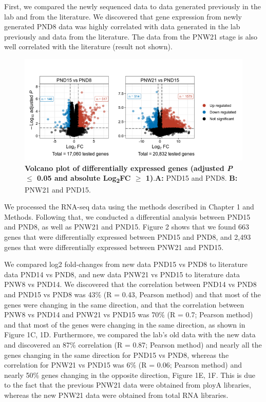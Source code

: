 \documentclass[12pt,twoside]{reedthesis}
\begin{document}
First, we compared the newly sequenced data to data generated previously
in the lab and from the literature. We discovered that gene expression
from newly generated PND8 data was highly correlated with data generated
in the lab previously and data from the literature. The data from the
PNW21 stage is also well correlated with the literature (result not
shown).



\begin{figure}[H]

{\centering \includegraphics{thesis_files/figure-latex/dn2-1} 

}

\caption[Volcano plot of differentially expressed genes]{\textbf{Volcano plot of differentially expressed genes (adjusted \textit{P} $\leq$ 0.05 and absolute Log\textsubscript{2}FC $\geq$ 1)}.\newline \textbf{A:}
PND15 and PND8. \textbf{B:} PNW21 and PND15.}\label{fig:dn2}
\end{figure}
We processed the RNA-seq data using the methods described in Chapter 1
and Methods. Following that, we conducted a differential analysis
between PND15 and PND8, as well as PNW21 and PND15. Figure 2 shows that
we found 663 genes that were differentially expressed between PND15 and
PND8, and 2,493 genes that were differentially expressed between PNW21
and PND15.

We compared log2 fold-changes from new data PND15 vs PND8 to literature
data PND14 vs PND8, and new data PNW21 vs PND15 to literature data PNW8
vs PND14. We discovered that the correlation between PND14 vs PND8 and
PND15 vs PND8 was 43\% (R = 0.43, Pearson method) and that most of the
genes were changing in the same direction, and that the correlation
between PNW8 vs PND14 and PNW21 vs PND15 was 70\% (R = 0.7; Pearson
method) and that most of the genes were changing in the same direction,
as shown in Figure 1C, 1D. Furthermore, we compared the lab's old data
with the new data and discovered an 87\% correlation (R = 0.87; Pearson
method) and nearly all the genes changing in the same direction for
PND15 vs PND8, whereas the correlation for PNW21 vs PND15 was 6\% (R =
0.06; Pearson method) and nearly 50\% genes changing in the opposite
direction, Figure 1E, 1F. This is due to the fact that the previous
PNW21 data were obtained from ployA libraries, whereas the new PNW21
data were obtained from total RNA libraries.
\end{document}
